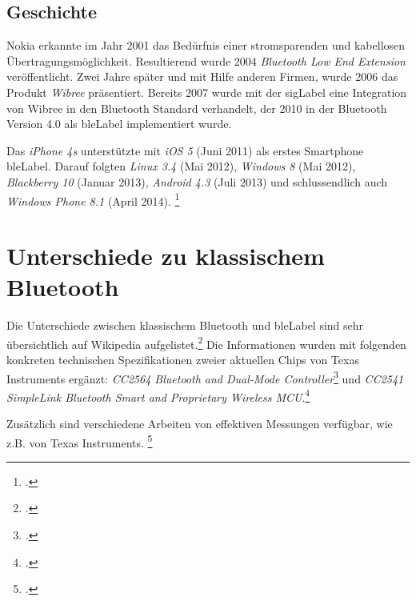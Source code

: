 \subsection{Geschichte}
Nokia erkannte im Jahr 2001 das Bedürfnis einer stromsparenden und kabellosen Übertragungsmöglichkeit. Resultierend wurde 2004 \textit{Bluetooth Low End Extension} veröffentlicht.
Zwei Jahre später und mit Hilfe anderen Firmen, wurde 2006 das Produkt \textit{Wibree} präsentiert.
Bereits 2007 wurde mit der \gls{sigLabel} eine Integration von Wibree in den Bluetooth Standard verhandelt, der 2010 in der Bluetooth Version 4.0 als \gls{bleLabel} implementiert wurde.

Das \textit{iPhone 4s} unterstützte mit \textit{iOS 5} (Juni 2011) als erstes Smartphone \gls{bleLabel}.
Darauf folgten \textit{Linux 3.4} (Mai 2012), \textit{Windows 8} (Mai 2012), \textit{Blackberry 10} (Januar 2013), \textit{Android 4.3} (Juli 2013) und schlussendlich auch \textit{Windows Phone 8.1} (April 2014).
\footcite{Bluetooth_low_energy_Wikipedia_2015-04-17}


\section{Unterschiede zu klassischem Bluetooth}
Die Unterschiede zwischen klassischem Bluetooth und \gls{bleLabel} sind sehr übersichtlich auf Wikipedia aufgelistet.\footcite{Bluetooth_low_energy_Wikipedia_2015-04-17}
Die Informationen wurden mit folgenden konkreten technischen Spezifikationen zweier aktuellen Chips von Texas Instruments ergänzt:
\textit{CC2564 Bluetooth and Dual-Mode Controller}\footcite{CC2564_DualMode_2015-05-08} und \textit{CC2541 SimpleLink Bluetooth Smart and Proprietary Wireless MCU}.\footcite{CC2541_BLE_2015-05-08}

Zusätzlich sind verschiedene Arbeiten von effektiven Messungen verfügbar, wie z.B. von Texas Instruments. \footcite{powerconsumption_comparison_2015-04-27}

